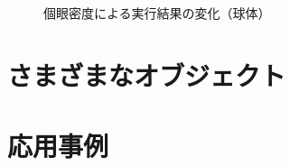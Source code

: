 \begin{figure}[htbp]
{\label{FReso100Sphere}}
  \caption{個眼密度による実行結果の変化（球体）}
  \label{FResoSphere}
\end{figure}



\section{さまざまなオブジェクト}%
\label{S}

\section{応用事例}%
\label{S}









